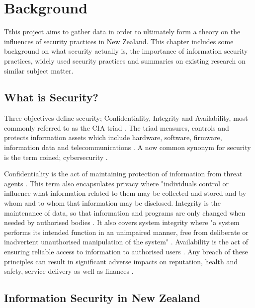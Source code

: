 \chapter{Background}\label{C:Background}

\par Tthis project aims to gather data in order to ultimately form a theory on the influences of security practices in New Zealand. This chapter includes some background on what security actually is, the importance of information security practices, widely used security practices and summaries on existing research on similar subject matter. 

\section{What is Security?}
\par Three objectives define security; Confidentiality, Integrity and Availability, most commonly referred to as the CIA triad \cite{craigbook}. The triad measures, controls and protects information assets which include hardware, software, firmware,  information data and telecommunications \cite{nist}. A now common synonym for security is the term coined; cybersecurity \cite{nist}. 
\newline
\par Confidentiality is the act of maintaining protection of information from threat agents \cite{craigbook}. This term also encapsulates privacy where "individuals control or influence what information related to them may be collected and stored and by whom and to whom that information may be disclosed\cite{craigbook}. Integrity is the maintenance of data, so that information and programs are only changed when needed by authorised bodies \cite{craigbook}. It also covers system integrity where "a system performs its intended function in an unimpaired manner, free from deliberate or inadvertent unauthorised manipulation of the system" \cite{craigbook}. Availability is the act of ensuring reliable access to information to authorised users \cite{craigbook}.  Any breach of these principles can result in significant adverse impacts on reputation, health and safety, service delivery as well as finances \cite{imp}.

\section{Information Security in New Zealand}

